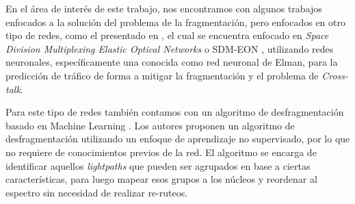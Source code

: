 En el área de interés de este trabajo, nos encontramos con algunos trabajos enfocados a la solución del problema de la fragmentación, pero enfocados en otro tipo de redes, como el presentado en \cite{trindade2020machine}, el cual se encuentra enfocado en \textit{Space Division Multiplexing Elastic Optical Networks} o SDM-EON , utilizando redes neuronales, específicamente una conocida como red neuronal de Elman, para la predicción de tráfico de forma a mitigar la fragmentación y el problema de \textit{Cross-talk}.

Para este tipo de redes también contamos con un algoritmo de desfragmentación basado en Machine Learning \cite{xiong2019machine}. Los autores proponen un algoritmo de desfragmentación utilizando un enfoque de aprendizaje no supervisado, por lo que no requiere de conocimientos previos de la red. El algoritmo se encarga de identificar aquellos \textit{lightpaths} que pueden ser agrupados en base a ciertas características, para luego mapear esos grupos a los núcleos y reordenar al espectro sin necesidad de realizar re-ruteos.



